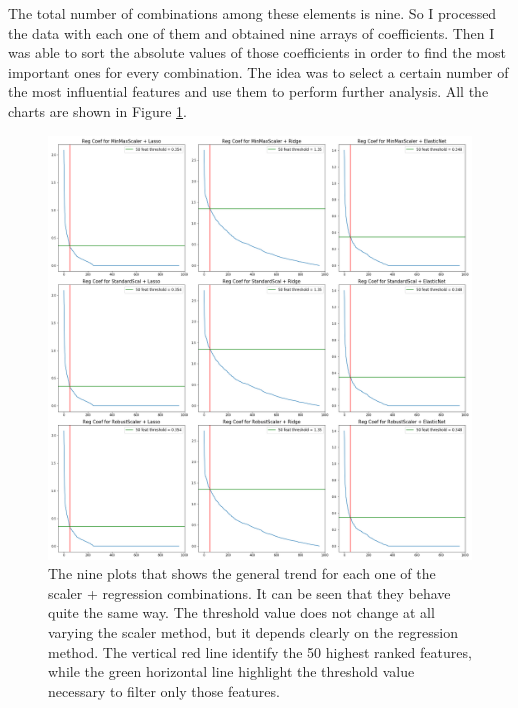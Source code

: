 \documentclass[12pt,a4paper]{report}
\begin{document}
The total number of combinations among these elements is nine. So I processed the data with each one of them and obtained nine arrays of coefficients. Then I was able to sort the absolute values of those coefficients in order to find the most important ones for every combination. The idea was to select a certain number of the most influential features and use them to perform further analysis. All the charts are shown in Figure \ref{fig:NineCoefPlot}.

\begin{figure}[h!]
  \begin{center}
  \includegraphics[width=0.7\linewidth]{NineCoefPlot.png}
  \caption{The nine plots that shows the general trend for each one of the scaler + regression combinations. It can be seen that they behave quite the same way. The threshold value does not change at all varying the scaler method, but it depends clearly on the regression method. The vertical red line identify the 50 highest ranked features, while the green horizontal line highlight the threshold value necessary to filter only those features.}
  \label{fig:NineCoefPlot}
  \end{center}
\end{figure}
\end{document}
